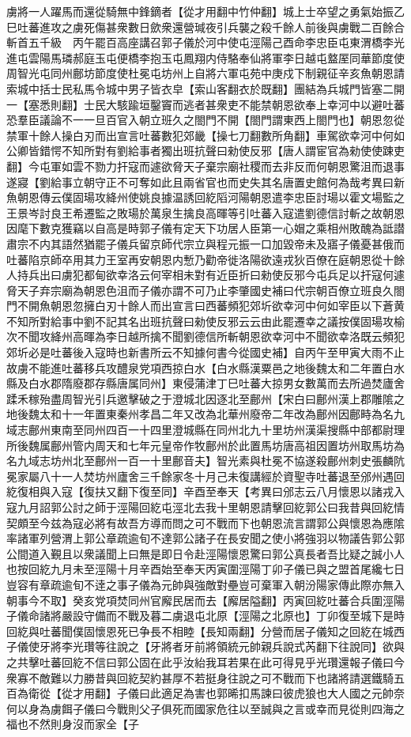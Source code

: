 虜將一人躍馬而還從騎無中鋒鏑者【從才用翻中竹仲翻】城上士卒望之勇氣始振乙巳吐蕃進攻之虜死傷甚衆數日歛衆還營瑊夜引兵襲之殺千餘人前後與虜戰二百餘合斬首五千級　丙午罷百高座講召郭子儀於河中使屯涇陽己酉命李忠臣屯東渭橋李光進屯雲陽馬璘郝庭玉屯便橋李抱玉屯鳳翔内侍駱奉仙將軍李日越屯盩厔同華節度使周智光屯同州鄜坊節度使杜冕屯坊州上自將六軍屯苑中庚戍下制親征辛亥魚朝恩請索城中括士民私馬令城中男子皆衣皁【索山客翻衣於既翻】團結為兵城門皆塞二開一【塞悉則翻】士民大駭踰垣鑿竇而逃者甚衆吏不能禁朝恩欲奉上幸河中以避吐蕃恐羣臣議論不一一旦百官入朝立班久之閤門不開【閤門謂東西上閤門也】朝恩忽從禁軍十餘人操白刃而出宣言吐蕃數犯郊畿【操七刀翻數所角翻】車駕欲幸河中何如公卿皆錯愕不知所對有劉給事者獨出班抗聲曰勑使反邪【唐人謂宦官為勑使使踈吏翻】今屯軍如雲不勠力扞寇而遽欲脅天子棄宗廟社稷而去非反而何朝恩驚沮而退事遂寢【劉給事立朝守正不可奪如此且兩省官也而史失其名唐置史館何為哉考異曰新魚朝恩傳云僕固瑒攻絳州使姚良據温誘回紇䧟河陽朝恩遣李忠臣討瑒以霍文場監之王景岑討良王希遷監之敗瑒於萬泉生擒良高暉等引吐蕃入寇遣劉德信討斬之故朝恩因麾下數克獲竊以自高是時郭子儀有定天下功居人臣第一心媢之乘相州敗醜為詆譛肅宗不内其語然猶罷子儀兵留京師代宗立與程元振一口加毀帝未及寤子儀憂甚俄而吐蕃陷京師卒用其力王室再安朝恩内慙乃勸帝徙洛陽欲遠戎狄百僚在庭朝恩從十餘人持兵出曰虜犯都甸欲幸洛云何宰相未對有近臣折曰勑使反邪今屯兵足以扞寇何遽脅天子弃宗廟為朝恩色沮而子儀亦謂不可乃止李肇國史補曰代宗朝百僚立班良久閤門不開魚朝恩忽擁白刃十餘人而出宣言曰西蕃頻犯郊圻欲幸河中何如宰臣以下蒼黄不知所對給事中劉不記其名出班抗聲曰勑使反邪云云由此罷遷幸之議按僕固瑒攻榆次不聞攻絳州高暉為李日越所擒不聞劉德信所斬朝恩欲幸河中不聞欲幸洛既云頻犯郊圻必是吐蕃後入寇時也新書所云不知據何書今從國史補】自丙午至甲寅大雨不止故虜不能進吐蕃移兵攻醴泉党項西掠白水【白水縣漢粟邑之地後魏太和二年置白水縣及白水郡隋廢郡存縣唐属同州】東侵蒲津丁巳吐蕃大掠男女數萬而去所過焚廬舍蹂禾稼殆盡周智光引兵邀擊破之于澄城北因逐北至鄜州【宋白曰鄜州漢上郡雕隂之地後魏太和十一年置東秦州孝昌二年又改為北華州廢帝二年改為鄜州因鄜畤為名九域志鄜州東南至同州四百一十四里澄城縣在同州北九十里坊州漢渠搜縣中部都尉理所後魏属鄜州管内周天和七年元皇帝作牧鄜州於此置馬坊唐高祖因置坊州取馬坊為名九域志坊州北至鄜州一百一十里鄜音夫】智光素與杜冕不協遂殺鄜州刺史張麟阬冕家屬八十一人焚坊州廬舍三千餘家冬十月己未復講經於資聖寺吐蕃退至邠州遇回紇復相與入寇【復扶又翻下復至同】辛酉至奉天【考異曰邠志云八月懷恩以諸戎入寇九月詔郭公討之師于涇陽回紇屯涇北去我十里朝恩請擊回紇郭公曰我昔與回紇情契頗至今兹為寇必將有故吾方導而問之可不戰而下也朝恩流言謂郭公與懷恩為應隂率諸軍列營渭上郭公章疏逾旬不達郭公諸子在長安聞之使小將強羽以物議告郭公郭公間道入覲且以衆議聞上曰無是即日令赴涇陽懷恩驚曰郭公真長者吾比疑之誠小人也按回紇九月未至涇陽十月辛酉始至奉天丙寅圍涇陽丁卯子儀已與之盟首尾纔七日豈容有章疏逾旬不逹之事子儀為元帥與強敵對壘豈可棄軍入朝汾陽家傳此際亦無入朝事今不取】癸亥党項焚同州官廨民居而去【廨居隘翻】丙寅回紇吐蕃合兵圍涇陽子儀命諸將嚴設守備而不戰及暮二虜退屯北原【涇陽之北原也】丁卯復至城下是時回紇與吐蕃聞僕固懷恩死已争長不相睦【長知兩翻】分營而居子儀知之回紇在城西子儀使牙將李光瓚等往說之【牙將者牙前將領統元帥親兵說式芮翻下往說同】欲與之共擊吐蕃回紇不信曰郭公固在此乎汝紿我耳若果在此可得見乎光瓚還報子儀曰今衆寡不敵難以力勝昔與回紇契約甚厚不若挺身往說之可不戰而下也諸將請選鐵騎五百為衛從【從才用翻】子儀曰此適足為害也郭晞扣馬諫曰彼虎狼也大人國之元帥奈何以身為虜餌子儀曰今戰則父子俱死而國家危往以至誠與之言或幸而見從則四海之福也不然則身沒而家全【子